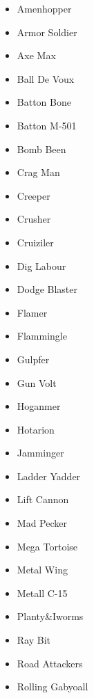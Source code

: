\begin{itemize}
=======
	\item \hypertarget{enem:Amenhopper}{Amenhopper}
	\item \hypertarget{enem:Armor_Soldier}{Armor Soldier}
	\item \hypertarget{enem:Axe_Max}{Axe Max}
	\item \hypertarget{enem:Ball_De_Voux}{Ball De Voux}
	\item \hypertarget{enem:Batton_Bone}{Batton Bone}
	\item \hypertarget{enem:Batton_M-501}{Batton M-501} 
	\item \hypertarget{enem:Bomb_Been}{Bomb Been}
	\item \hypertarget{enem:Crag_Man} {Crag Man}
	\item \hypertarget{enem:Creeper} {Creeper}
	\item \hypertarget{enem:Crusher}{Crusher}
	\item \hypertarget{enem:Cruiziler}{Cruiziler}
	\item \hypertarget{enem:Dig_Labour}{Dig Labour}
	\item \hypertarget{enem:Dodge_Blaster}{Dodge Blaster}
	\item \hypertarget{enem:Flamer}{Flamer} 
	\item \hypertarget{enem:Flammingle}{Flammingle}
	\item \hypertarget{enem:Gulpfer}{Gulpfer}
	\item \hypertarget{enem:Gun_Volt}{Gun Volt}
	\item \hypertarget{enem:Hoganmer}{Hoganmer}
	\item \hypertarget{enem:Hotarion}{Hotarion}
	\item \hypertarget{enem:Jamminger}{Jamminger}
	\item \hypertarget{enem:Ladder_Yadder}{Ladder Yadder}
	\item \hypertarget{enem:Lift Cannon}{Lift Cannon}
	\item \hypertarget{enem:Mad_Pecker} {Mad Pecker}
	\item \hypertarget{enem:Mega_Tortoise}{Mega Tortoise}
	\item \hypertarget{enem:Metal_Wing}{Metal Wing}
	\item \hypertarget{enem:Metall_C-15}{Metall C-15} 
	\item \hypertarget{enem:Planty_Iworms} {Planty\&Iworms}
	\item \hypertarget{enem:Ray_Bit}{Ray Bit}
	\item \hypertarget{enem:Road_Attackers}{Road Attackers}
	\item \hypertarget{enem:Rolling_Gabyoall}{Rolling Gabyoall}

\end{itemize}
